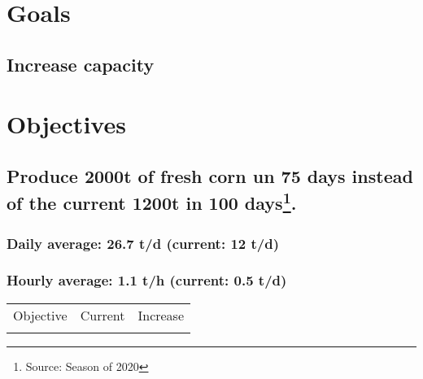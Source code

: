 \documentclass[11pt]{article}
\author{Ricardo Antunes}
\date{\today}
\title{}
\begin{document}
\tableofcontents

\section{Goals}
\label{sec:org849f2a5}
\subsection{Increase capacity}
\label{sec:orgdcebc42}

\section{Objectives}
\label{sec:orgac9799a}
\subsection{Produce 2000t of fresh corn un 75 days instead of the current 1200t in 100 days\footnote{Source: Season of 2020}.}
\label{sec:org8a40ac6}
\subsubsection{Daily average: 26.7 t/d (current: 12 t/d)}
\label{sec:org4d6adf4}
\subsubsection{Hourly average: 1.1 t/h (current: 0.5 t/d)}
\label{sec:org7a48f83}


\begin{center}
\begin{tabular}{lll}
Objective & Current & Increase\\
 &  & \\
\end{tabular}
\end{center}
\end{document}
